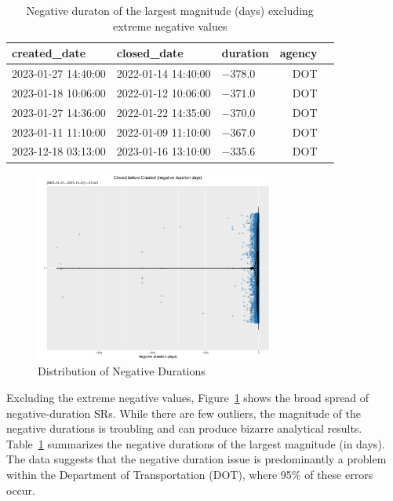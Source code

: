\documentclass[linenumber]{jdsart}
\begin{document}
\begin{table}[tbp]
  \centering
  \caption{Negative duraton of the largest magnitude (days) excluding
    extreme negative values}
  \begin{tabular}{l l l r l}
    \toprule
    {created\_date} & {closed\_date} & {duration} 
    & \textbf{agency} \\
    \midrule
    2023-01-27 14:40:00 & 2022-01-14 14:40:00 & $-$378.0 & DOT \\
    2023-01-18 10:06:00 & 2022-01-12 10:06:00 & $-$371.0 & DOT \\
    2023-01-27 14:36:00 & 2022-01-22 14:35:00 & $-$370.0 & DOT \\
    2023-01-11 11:10:00 & 2022-01-09 11:10:00 & $-$367.0 & DOT \\
    2023-12-18 03:13:00 & 2023-01-16 13:10:00 & $-$335.6 & DOT \\
    \bottomrule
  \end{tabular}
  \label{tab:largest-errors}
\end{table}


\begin{figure}[tbp]
	 \centering
 	 \includegraphics[width = 0.7\textwidth]{negative_duration_SR_violin.pdf}
 \caption{Distribution of Negative Durations}
 \label{fig:negative-duration-violin}
\end{figure}


Excluding the extreme negative values, 
Figure~\ref{fig:negative-duration-violin} shows the broad spread of 
negative-duration SRs. While there are few outliers, the magnitude 
of the negative durations is troubling and can produce bizarre 
analytical results. Table~\ref{tab:largest-errors} summarizes the 
negative durations of the largest magnitude (in days). The data 
suggests that the negative duration issue is predominantly a problem 
within the Department of Transportation (DOT), where 95\% of these 
errors occur.
\end{document}
